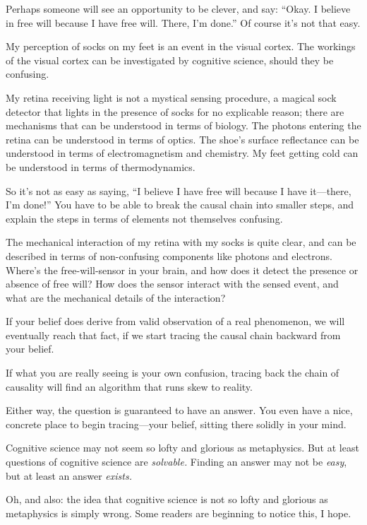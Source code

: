 {
 Perhaps someone will see an opportunity to be clever, and say:
``Okay. I believe in free will because I have free
will. There, I'm done.'' Of course
it's not that easy.}

{
 My perception of socks on my feet is an event in the visual
cortex. The workings of the visual cortex can be investigated by
cognitive science, should they be confusing.}

{
 My retina receiving light is not a mystical sensing procedure, a
magical sock detector that lights in the presence of socks for no
explicable reason; there are mechanisms that can be understood in terms
of biology. The photons entering the retina can be understood in terms
of optics. The shoe's surface reflectance can be
understood in terms of electromagnetism and chemistry. My feet getting
cold can be understood in terms of thermodynamics.}

{
 So it's not as easy as saying,
``I believe I have free will because I have
it---there, I'm done!'' You have to
be able to break the causal chain into smaller steps, and explain the
steps in terms of elements not themselves confusing.}

{
 The mechanical interaction of my retina with my socks is quite
clear, and can be described in terms of non-confusing components like
photons and electrons. Where's the free-will-sensor in
your brain, and how does it detect the presence or absence of free
will? How does the sensor interact with the sensed event, and what are
the mechanical details of the interaction?}

{
 If your belief does derive from valid observation of a real
phenomenon, we will eventually reach that fact, if we start tracing the
causal chain backward from your belief.}

{
 If what you are really seeing is your own confusion, tracing back
the chain of causality will find an algorithm that runs skew to
reality.}

{
 Either way, the question is guaranteed to have an answer. You even
have a nice, concrete place to begin tracing---your belief, sitting
there solidly in your mind.}

{
 Cognitive science may not seem so lofty and glorious as
metaphysics. But at least questions of cognitive science are
\textit{solvable.} Finding an answer may not be \textit{easy}, but at
least an answer \textit{exists.}}

{
 Oh, and also: the idea that cognitive science is not so lofty and
glorious as metaphysics is simply wrong. Some readers are beginning to
notice this, I hope.}

